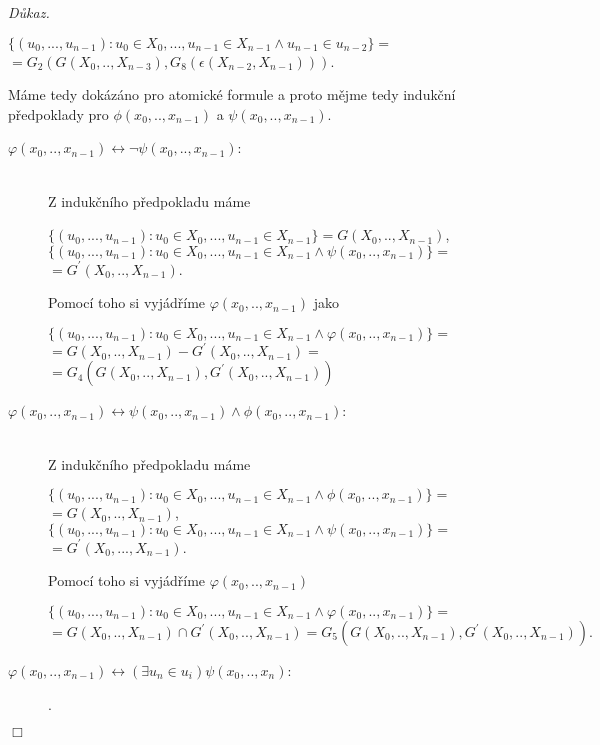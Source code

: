 \documentclass[12pt,a4paper]{article}
\newenvironment{proof}
{\noindent \textit{D\r{u}kaz.}}
{\hspace*{\fill} $\Box$}
\begin{document}
\begin{proof}
\begin{description}
\begin{center}
  $\{(u_0 ,.. ., u_{n-1}) : u_0 \in  X_0,..., u_{n-1}  \in  X_{n-1} \wedge  u_{n-1} \in  u_{n-2}  \} = $ 
$=G_2(G(X_0,.., X_{n-3}),G_8(\epsilon(X_{n-2},X_{n-1})))$.
 \end{center}
\end{description}
M\'{a}me tedy dok\'{a}z\'{a}no pro atomick\'{e} formule a proto m\v{e}jme tedy induk\v{c}n\'{i} p\v{r}edpoklady pro $  \phi(x_0,..,x_{n-1}) $ a $ \psi(x_0,..,x_{n-1}) $.
\begin{description}
\item[ $\varphi(x_0,.., x_{n-1})\leftrightarrow \neg \psi(x_0,.., x_{n-1})$:]~\\
Z induk\v{c}n\'{i}ho p\v{r}edpokladu m\'{a}me
\begin{center}
$\{(u_{0},..., u_{n-1}) : u_{0} \in  X_{0},...,  u_{n-1} \in  X_{n-1}  \}=G(X_{0},..,X_{n-1})$,
$\{(u_{0},..., u_{n-1}) : u_{0} \in  X_{0},...,  u_{n-1} \in  X_{n-1} \wedge \psi(x_0,..,x_{n-1})  \}=$ $=G^{'}(X_{0},..,X_{n-1})$. 
\end{center}
Pomoc\'{i} toho si vyj\'{a}d\v{r}\'{i}me  $\varphi(x_0,..,x_{n-1})$ jako
\begin{center}
$\{(u_{0},..., u_{n-1}) : u_{0} \in  X_{0},...,  u_{n-1} \in  X_{n-1} \wedge \varphi(x_0,..,x_{n-1})  \}=$ $=G(X_{0},..,X_{n-1}) - G^{'}(X_{0},..,X_{n-1}) = $ \\$=G_4(G(X_{0},..,X_{n-1}),G^{'}(X_{0},..,X_{n-1})) $
\end{center}
\newpage
\item[$ \varphi(x_0,.., x_{n-1})\leftrightarrow \psi(x_0,..,x_{n-1}) \wedge \phi(x_0,..,x_{n-1})$:]~\\
Z induk\v{c}n\'{i}ho p\v{r}edpokladu m\'{a}me
\begin{center}
$\{(u_{0},..., u_{n-1}) : u_{0} \in  X_{0},...,  u_{n-1} \in  X_{n-1} \wedge \phi(x_0,..,x_{n-1})  \}=$ $=G(X_{0},..,X_{n-1})$,
$\{(u_{0},..., u_{n-1}) : u_{0} \in  X_{0},...,  u_{n-1} \in  X_{n-1} \wedge \psi(x_0,..,x_{n-1})  \}=$ $=G^{'}(X_{0},...,X_{n-1})$.
\end{center}
Pomoc\'{i} toho si vyj\'{a}d\v{r}\'{i}me  $\varphi(x_0,..,x_{n-1})$
 \begin{center}
 $\{(u_{0},..., u_{n-1}) : u_{0} \in  X_{0},...,  u_{n-1} \in  X_{n-1} \wedge \varphi(x_0,..,x_{n-1})   \}=$ $=G(X_{0},..,X_{n-1}) \cap G^{'}(X_{0},..,X_{n-1})=G_5(G(X_0,..,X_{n-1}),G^{'}(X_{0},..,X_{n-1})) .$
 \end{center}
\item[$\varphi(x_0,.., x_{n-1})\leftrightarrow(\exists u_{n} \in u_i) \psi(x_0,..,x_{n})$:].~\\

\end{description}
\end{proof}
\end{document}
